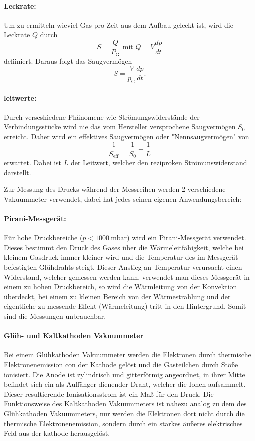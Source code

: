 \paragraph{Leckrate:}
Um zu ermitteln wieviel Gas pro Zeit aus dem Aufbau geleckt ist, wird die Leckrate $Q$ durch
\begin{equation}
  S  = \frac{Q}{P_\text{G}} \text{ mit } Q = V\frac{dp}{dt}
\end{equation}
 defiiniert. Daraus folgt das Saugvermögen
 \begin{equation}
   S = \frac{V}{p_\text{G}}\frac{dp}{dt}.
 \end{equation}

 \paragraph{leitwerte:}
 Durch verscshiedene Phänomene wie Strömungswiderstände der Verbindungsstücke wird nie das vom Hersteller versprochene Saugvermögen $S_0$ erreicht.
 Daher wird ein effektives Saugvermögen oder "Nennsaugvermögen" von
 \begin{equation}
   \frac{1}{S_\text{eff}} = \frac{1}{S_0} + \frac{1}{L}
 \end{equation}
 erwartet. Dabei ist $L$ der Leitwert, welcher den reziproken Strömunswiderstand darstellt.

 Zur Messung des Drucks während der Messreihen werden 2 verschiedene Vakuummeter verwendet, dabei hat jedes seinen eigenen Anwendungsbereich:

 \paragraph{Pirani-Messgerät:}
 Für hohe Druckbereiche ($p < \SI{1000}{\milli\bar}$) wird ein Pirani-Messgerät verwendet. Dieses bestimmt den Druck des Gases über die Wärmeleitfähigkeit, welche
 bei kleinem Gasdruck immer kleiner wird und die Temperatur des im Messgerät befestigten Glühdrahts steigt. Dieser Anstieg an Temperatur verursacht einen Widerstand,
 welcher gemessen werden kann. verwendet man dieses Messgerät in einem zu hohen Druckbereich, so wird die Wärmleitung von der Konvektion überdeckt, bei einem zu kleinen
 Bereich von der Wärmestrahlung und der eigentliche zu messende Effekt (Wärmeleitung) tritt in den Hintergrund. Somit sind die Messungen unbrauchbar.

\paragraph{Glüh- und Kaltkathoden Vakuummeter}
Bei einem Glühkathoden Vakuummeter werden die Elektronen durch thermische Elektronenemission con der Kathode gelöst und die Gasteilchen durch Stöße ionisiert. Die
Anode ist zylindrisch und gitterförmig angeordnet, in ihrer Mitte befindet sich ein als Auffänger dienender Draht, welcher die Ionen aufsammelt. Dieser resultierende
Ionisationsstrom ist ein Maß für den Druck.
Die Funktionsweise des Kaltkathoden Vakuummeters ist nahezu analog zu dem des Glühkathoden Vakuummeters, nur werden die Elektronen dort nicht durch die thermische Elektronenemission,
sondern durch ein starkes äußeres elektrisches Feld aus der kathode herausgelöst.

